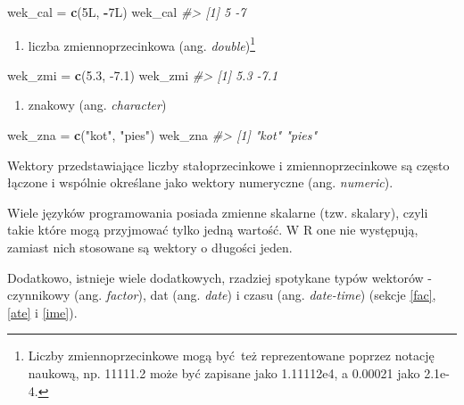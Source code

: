\documentclass[paper=6in:9in,pagesize=pdftex,headinclude=on,footinclude=on,10pt]{scrbook}
\newenvironment{Shaded}{\begin{snugshade}}{\end{snugshade}}
\newcommand{\CommentTok}[1]{\textcolor[rgb]{0.56,0.35,0.01}{\textit{#1}}}
\newcommand{\FloatTok}[1]{\textcolor[rgb]{0.00,0.00,0.81}{#1}}
\newcommand{\KeywordTok}[1]{\textcolor[rgb]{0.13,0.29,0.53}{\textbf{#1}}}
\newcommand{\NormalTok}[1]{#1}
\newcommand{\OperatorTok}[1]{\textcolor[rgb]{0.81,0.36,0.00}{\textbf{#1}}}
\newcommand{\StringTok}[1]{\textcolor[rgb]{0.31,0.60,0.02}{#1}}
\providecommand{\tightlist}{%
  \setlength{\itemsep}{0pt}\setlength{\parskip}{0pt}}
\let\BeginKnitrBlock\begin \let\EndKnitrBlock\end
\begin{document}
\begin{Shaded}
\begin{Highlighting}[]
\NormalTok{wek_cal =}\StringTok{ }\KeywordTok{c}\NormalTok{(5L, }\OperatorTok{-}\NormalTok{7L)}
\NormalTok{wek_cal}
\CommentTok{#> [1]  5 -7}
\end{Highlighting}
\end{Shaded}

\begin{enumerate}
\def\labelenumi{\arabic{enumi}.}
\setcounter{enumi}{2}
\tightlist
\item
  liczba zmiennoprzecinkowa (ang. \emph{double})\footnote{Liczby zmiennoprzecinkowe mogą być~też reprezentowane poprzez notację naukową, np. 11111.2 może być zapisane jako 1.11112e4, a 0.00021 jako 2.1e-4.}
\end{enumerate}

\begin{Shaded}
\begin{Highlighting}[]
\NormalTok{wek_zmi =}\StringTok{ }\KeywordTok{c}\NormalTok{(}\FloatTok{5.3}\NormalTok{, }\FloatTok{-7.1}\NormalTok{)}
\NormalTok{wek_zmi}
\CommentTok{#> [1]  5.3 -7.1}
\end{Highlighting}
\end{Shaded}

\begin{enumerate}
\def\labelenumi{\arabic{enumi}.}
\setcounter{enumi}{3}
\tightlist
\item
  znakowy (ang. \emph{character})
\end{enumerate}

\begin{Shaded}
\begin{Highlighting}[]
\NormalTok{wek_zna =}\StringTok{ }\KeywordTok{c}\NormalTok{(}\StringTok{"kot"}\NormalTok{, }\StringTok{"pies"}\NormalTok{)}
\NormalTok{wek_zna}
\CommentTok{#> [1] "kot"  "pies"}
\end{Highlighting}
\end{Shaded}

Wektory przedstawiające liczby stałoprzecinkowe i zmiennoprzecinkowe są często łączone i wspólnie określane jako wektory numeryczne (ang. \emph{numeric}).

\BeginKnitrBlock{rmdinfo}
Wiele języków programowania posiada zmienne skalarne (tzw. skalary), czyli takie które mogą przyjmować tylko jedną wartość.
W R one nie występują, zamiast nich stosowane są wektory o długości jeden.
\EndKnitrBlock{rmdinfo}

Dodatkowo, istnieje wiele dodatkowych, rzadziej spotykane typów wektorów - czynnikowy (ang. \emph{factor}), dat (ang. \emph{date}) i czasu (ang. \emph{date-time}) (sekcje \ref{fac}, \ref{ate} i \ref{ime}).
\end{document}
